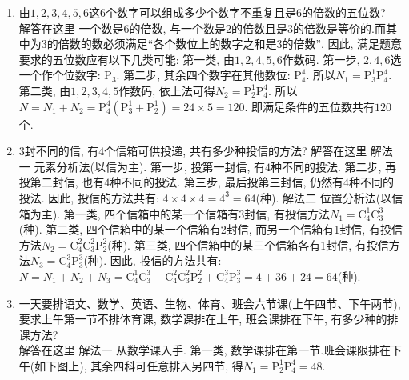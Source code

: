 \documentclass[10pt,a4paper]{article}
\begin{document}
\begin{enumerate}[1.]

\item 由$1, 2, 3, 4, 5, 6$这$6$个数字可以组成多少个数字不重复且是$6$的倍数的五位数?\\
解答在这里  一个数是$6$的倍数, 与一个数是$2$的倍数且是$3$的倍数是等价的.而其中为$3$的倍数的数必须满足``各个数位上的数字之和是$3$的倍数'', 因此, 满足题意要求的五位数应有以下几类可能:
第一类, 由$1, 2, 4, 5, 6$作数码.
第一步, $2, 4, 6$选一个作个位数字: $\mathrm{P}_3^1$.
第二步, 其余四个数字在其他数位: $\mathrm{P}_4^4$.
所以$N_1=\mathrm{P}_3^1\mathrm{P}_4^4$.
第二类, 由$1, 2, 3, 4, 5$作数码, 依上法可得$N_2=\mathrm{P}_2^1\mathrm{P}_4^4$.
所以$N=N_1+N_2=\mathrm{P}_4^4(\mathrm{P}_3^1+\mathrm{P}_2^1)=24\times 5=120$.
即满足条件的五位数共有$120$个.
\item $3$封不同的信, 有$4$个信箱可供投递, 共有多少种投信的方法?
解答在这里 解法一  元素分析法(以信为主).
第一步, 投第一封信, 有$4$种不同的投法.
第二步, 再投第二封信, 也有$4$种不同的投法.
第三步, 最后投第三封信, 仍然有$4$种不同的投法.
因此, 投信的方法共有: $4\times 4\times 4=4^3=64$(种).
解法二  位置分析法(以信箱为主).
第一类, 四个信箱中的某一个信箱有3封信, 有投信方法$N_1=\mathrm{C}_4^1\mathrm{C}_3^3$(种).
第二类, 四个信箱中的某一个信箱有2封信, 而另一个信箱有1封信, 有投信方法$N_2=\mathrm{C}_4^2\mathrm{C}_3^2\mathrm{P}_2^2$(种).
第三类, 四个信箱中的某三个信箱各有1封信, 有投信方法$N_3=\mathrm{C}_4^3\mathrm{P}_3^3$(种).
因此, 投信的方法共有:
$N=N_1+N_2+N_3=\mathrm{C}_4^1\mathrm{C}_3^3+\mathrm{C}_4^2\mathrm{C}_3^2\mathrm{P}_2^2+\mathrm{C}_4^3\mathrm{P}_3^3=4+36+24=64$(种).
\item 一天要排语文、数学、英语、生物、体育、班会六节课(上午四节、下午两节), 要求上午第一节不排体育课, 数学课排在上午, 班会课排在下午, 有多少种的排课方法?\\
解答在这里 解法一  从数学课入手.
第一类, 数学课排在第一节.班会课限排在下午(如下图上), 其余四科可任意排入另四节, 得$N_1=\mathrm{P}_2^1\mathrm{P}_4^4=48$.
\begin{center}
\end{center}

\end{enumerate}
\end{document}
